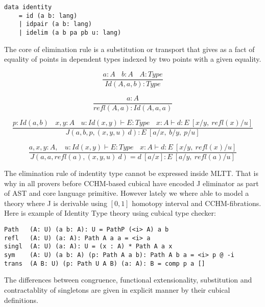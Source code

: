\begin{lstlisting}[mathescape=true]
data identity
    = id (a b: lang)
    | idpair (a b: lang)
    | idelim (a b pa pb u: lang)
\end{lstlisting}

The core of elimination rule is a substitution or transport that gives as
a fact of equality of points in dependent types indexed by two points with a given equality.

\begin{equation}
\tag{$Id$-formation}
\dfrac
  {a:A\ \ \ \ b:A\ \ \ \ A:Type}
  {Id(A,a,b) : Type}
\end{equation}

\begin{equation}
\tag{$Id$-intro}
\dfrac
  {a:A}
  {refl(A,a) : Id(A,a,a) }
\end{equation}

\begin{equation}
\tag{$J$-elimination}
\dfrac
  {p:Id(a,b)\ \ \ \ x,y:A\ \ \ \ u:Id(x,y) \vdash E:Type\ \ \ \ x:A \vdash d: E\ [x/y,\ refl(x)/u]}
  {J(a,b,p,(x,y,u)\ d) : E\ [a/x,\ b/y,\ p/u]}
\end{equation}

\begin{equation}
\tag{$Id$-computation}
\dfrac
  {a,x,y:A,\ \ \ \ u:Id(x,y) \vdash E:Type\ \ \ \ x:A \vdash d:E\ [x/y,\ refl(x)/u]}
  {J(a,a,refl(a),(x,y,u)\ d) = d\ [a/x] : E\ [a/y,\ refl(a)/u]}
\end{equation}

The elimination rule of indentity type cannot be expressed inside MLTT. That is why in all provers
before CCHM-based cubical have encoded J eliminator as part of AST and core language primitive.
However lately we where able to model a theory where J is derivable using $[0,1]$
homotopy interval \cite{Mortberg17} and CCHM-fibrations. Here is example of Identity Type theory
using cubical type checker:

\begin{lstlisting}[mathescape=true]
Path   (A: U) (a b: A): U = PathP (<i> A) a b
refl   (A: U) (a: A): Path A a a = <i> a
singl  (A: U) (a: A): U = (x : A) * Path A a x
sym    (A: U) (a b: A) (p: Path A a b): Path A b a = <i> p @ -i
trans  (A B: U) (p: Path U A B) (a: A): B = comp p a []
\end{lstlisting}

\newpage
The differences between congruence, functional extensionality,
substitution and contractablity of singletons are given in explicit manner
by their cubical definitions.

